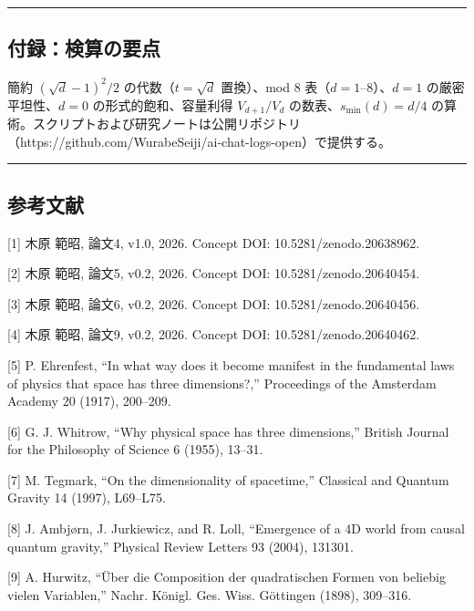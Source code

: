 \documentclass[
]{ltjsarticle}
\begin{document}
\begin{center}\rule{0.5\linewidth}{0.5pt}\end{center}

\subsection{付録：検算の要点}\label{ux4ed8ux9332ux691cux7b97ux306eux8981ux70b9}

簡約 \((\sqrt d-1)^2/2\) の代数（\(t=\sqrt d\) 置換）、mod 8
表（\(d=1\)--\(8\)）、\(d=1\) の厳密平坦性、\(d=0\)
の形式的飽和、容量利得 \(V_{d+1}/V_d\) の数表、\(s_{\min}(d)=d/4\)
の算術。スクリプトおよび研究ノートは公開リポジトリ（https://github.com/WurabeSeiji/ai-chat-logs-open）で提供する。

\begin{center}\rule{0.5\linewidth}{0.5pt}\end{center}

\subsection{参考文献}\label{ux53c2ux8003ux6587ux732e}

{[}1{]} 木原 範昭, 論文4, v1.0, 2026. Concept DOI:
10.5281/zenodo.20638962.

{[}2{]} 木原 範昭, 論文5, v0.2, 2026. Concept DOI: 10.5281/zenodo.20640454.

{[}3{]} 木原 範昭, 論文6, v0.2, 2026. Concept DOI: 10.5281/zenodo.20640456.

{[}4{]} 木原 範昭, 論文9, v0.2, 2026. Concept DOI: 10.5281/zenodo.20640462.

{[}5{]} P. Ehrenfest, ``In what way does it become manifest in the
fundamental laws of physics that space has three dimensions?,''
Proceedings of the Amsterdam Academy 20 (1917), 200--209.

{[}6{]} G. J. Whitrow, ``Why physical space has three dimensions,''
British Journal for the Philosophy of Science 6 (1955), 13--31.

{[}7{]} M. Tegmark, ``On the dimensionality of spacetime,'' Classical
and Quantum Gravity 14 (1997), L69--L75.

{[}8{]} J. Ambjørn, J. Jurkiewicz, and R. Loll, ``Emergence of a 4D
world from causal quantum gravity,'' Physical Review Letters 93 (2004),
131301.

{[}9{]} A. Hurwitz, ``Über die Composition der quadratischen Formen von
beliebig vielen Variablen,'' Nachr. Königl. Ges. Wiss. Göttingen (1898),
309--316.
\end{document}
